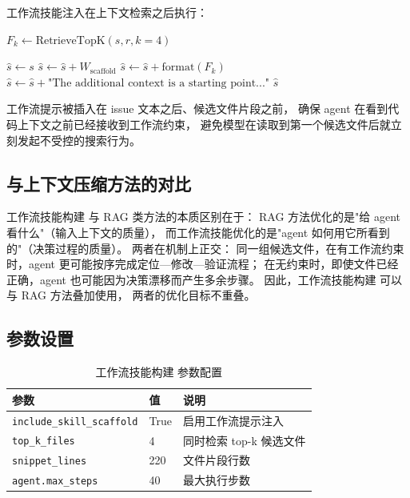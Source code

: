 工作流技能注入在上下文检索之后执行：

\begin{algorithm}[H]
\caption{工作流技能构建：skill\_abstraction}
\label{alg:skill-abstraction}

\BlankLine
{}
$F_k \leftarrow \text{RetrieveTopK}(s, r, k=4)$\;

\BlankLine
{}
$\hat{s} \leftarrow s$\;
$\hat{s} \leftarrow \hat{s} + W_{\text{scaffold}}$ 
$\hat{s} \leftarrow \hat{s} + \text{format}(F_k)$ 
$\hat{s} \leftarrow \hat{s} + \text{"The additional context is a starting point..."}$\;
\Return $\hat{s}$\;
\end{algorithm}

工作流提示被插入在 issue 文本之后、候选文件片段之前，
确保 agent 在看到代码上下文之前已经接收到工作流约束，
避免模型在读取到第一个候选文件后就立刻发起不受控的搜索行为。

\subsection{与上下文压缩方法的对比}

工作流技能构建 与 RAG 类方法的本质区别在于：
RAG 方法优化的是"给 agent 看什么"（输入上下文的质量），
而工作流技能优化的是"agent 如何用它所看到的"（决策过程的质量）。
两者在机制上正交：
同一组候选文件，在有工作流约束时，agent 更可能按序完成定位—修改—验证流程；
在无约束时，即使文件已经正确，agent 也可能因为决策漂移而产生多余步骤。
因此，工作流技能构建 可以与 RAG 方法叠加使用，
两者的优化目标不重叠。

\subsection{参数设置}

\begin{table}[htbp]
\centering
\caption{工作流技能构建 参数配置}
\label{tab:skill-abs-params}
\begin{tabular}{lll}
\toprule
参数 & 值 & 说明 \\
\midrule
\texttt{include\_skill\_scaffold} & True & 启用工作流提示注入 \\
\texttt{top\_k\_files} & 4 & 同时检索 top-k 候选文件 \\
\texttt{snippet\_lines} & 220 & 文件片段行数 \\
\texttt{agent.max\_steps} & 40 & 最大执行步数 \\
\bottomrule
\end{tabular}
\end{table}

